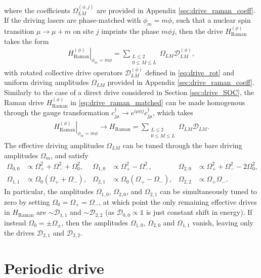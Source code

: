 \documentclass[nofootinbib,notitlepage,11pt]{revtex4-2}
\renewcommand{\t}{\text} %
\newcommand{\p}[1]{\left(#1\right)} %
\newcommand{\1}{\mathds{1}}
\newcommand{\D}{\mathcal{D}}
\begin{document}
where the coefficients $\Omega_{LM}^{(\phi,j)}$ are provided in
Appendix \ref{sec:drive_raman_coeff}.  If the driving lasers are
phase-matched with $\phi_m=m\phi$, such that a nuclear spin transition
$\mu\to\mu+m$ on site $j$ imprints the phase $m\phi j$, then the drive
$H_{\t{Raman}}^{(\phi)}$ takes the form
\begin{align}
  \left. H_{\t{Raman}}^{(\phi)} \right|_{\phi_m=m\phi}
  = \sum_{\substack{L\le2\\0\le M\le L}}
  \Omega_{LM} \D_{LM}^{(\phi)},
  \label{eq:drive_raman_matched}
\end{align}
with rotated collective drive operators $\D_{LM}^{(\phi)}$ defined in
\eqref{eq:drive_rot} and uniform driving amplitudes $\Omega_{LM}$
provided in Appendix \ref{sec:drive_raman_coeff}.  Similarly to the
case of a direct drive considered in Section \ref{sec:drive_SOC}, the
Raman drive $H_{\t{Raman}}^{(\phi)}$ in \eqref{eq:drive_raman_matched}
can be made homogenous through the gauge transformation
$c_{j\mu}^\dag \to e^{i\mu\phi j} c_{j\mu}^\dag$, which takes
\begin{align}
  \left. H_{\t{Raman}}^{(\phi)} \right|_{\phi_m=m\phi}
  \to H_{\t{Raman}}
  = \sum_{\substack{L\le2\\0\le M\le L}} \Omega_{LM} \D_{LM}.
\end{align}
The effective driving amplitudes $\Omega_{LM}$ can be tuned through
the bare driving amplitudes $\Omega_m$, and satisfy
\begin{align}
  \Omega_{0,0} &\propto \Omega_+^2 + \Omega_-^2 + \Omega_0^2,
  &
  \Omega_{1,0} &\propto \Omega_+^2 - \Omega_-^2,
  &
  \Omega_{2,0} &\propto \Omega_+^2 + \Omega_-^2 - 2\Omega_0^2,
  \\
  \Omega_{1,1} &\propto \Omega_0 \p{\Omega_+ + \Omega_-},
  &
  \Omega_{2,1} &\propto \Omega_0 \p{\Omega_+ - \Omega_-},
  &
  \Omega_{2,2} &\propto \Omega_+ \Omega_-.
\end{align}
In particular, the amplitudes $\Omega_{1,0}$, $\Omega_{2,0}$, and
$\Omega_{2,1}$ can be simultaneously tuned to zero by setting
$\Omega_0=\Omega_+=\Omega_-$, at which point the only remaining
effective drives in $H_{\t{Raman}}$ are $\sim\D_{1,1}$ and
$\sim\D_{2,2}$ (as $\D_{0,0}\propto\1$ is just constant shift in
energy).  If instead $\Omega_0=\pm\Omega_\pm$, then the amplitudes
$\Omega_{1,0}$, $\Omega_{2,0}$ and $\Omega_{1,1}$ vanish, leaving only
the drives $\D_{2,1}$ and $\D_{2,2}$.

\section{Periodic drive}
\end{document}
